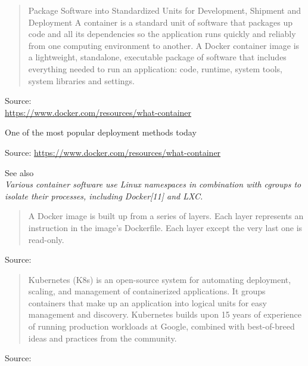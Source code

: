 \documentclass[Screen16to9,17pt]{foils}
\begin{document}

\begin{quote}
  Package Software into Standardized Units for Development, Shipment and Deployment
  A container is a standard unit of software that packages up code and all its dependencies so the application runs quickly and reliably from one computing environment to another. A Docker container image is a lightweight, standalone, executable package of software that includes everything needed to run an application: code, runtime, system tools, system libraries and settings.
\end{quote}
Source: \\{\footnotesize
\url{https://www.docker.com/resources/what-container}}

\begin{list2}
  \item One of the most popular deployment methods today
\end{list2}



Source: {\footnotesize
\url{https://www.docker.com/resources/what-container}}

\begin{list2}
  \item See also \\
   \emph{Various container software use Linux namespaces in combination with cgroups to isolate their processes, including Docker[11] and LXC.}
\end{list2}



\begin{quote}
A Docker image is built up from a series of layers. Each layer represents an instruction in the image’s Dockerfile. Each layer except the very last one is read-only.
\end{quote}

Source: {\footnotesize
{}}





\begin{quote}
  Kubernetes (K8s) is an open-source system for automating deployment, scaling, and management of containerized applications.
  It groups containers that make up an application into logical units for easy management and discovery. Kubernetes builds upon 15 years of experience of running production workloads at Google, combined with best-of-breed ideas and practices from the community.
\end{quote}
Source: {\footnotesize
{}}
\end{document}
